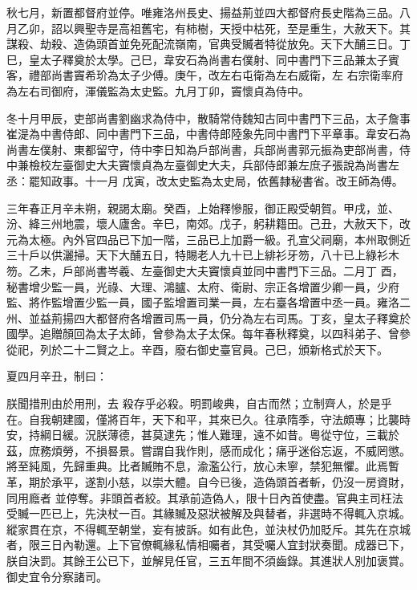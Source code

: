 \begin{pinyinscope}
 秋七月，新置都督府並停。唯雍洛州長史、揚益荊並四大都督府長史階為三品。八月乙卯，詔以興聖寺是高祖舊宅，有柿樹，天授中枯死，至是重生，大赦天下。其謀殺、劫殺、造偽頭首並免死配流嶺南，官典受贓者特從放免。天下大酺三日。丁巳，皇太子釋奠於太學。己巳，韋安石為尚書右僕射、同中書門下三品兼太子賓客，禮部尚書竇希玠為太子少傅。庚午，改左右屯衛為左右威衛，左
 右宗衛率府為左右司御府，渾儀監為太史監。九月丁卯，竇懷貞為侍中。



 冬十月甲辰，吏部尚書劉幽求為侍中，散騎常侍魏知古同中書門下三品，太子詹事崔湜為中書侍郎、同中書門下三品，中書侍郎陸象先同中書門下平章事。韋安石為尚書左僕射、東都留守，侍中李日知為戶部尚書，兵部尚書郭元振為吏部尚書，侍中兼檢校左臺御史大夫竇懷貞為左臺御史大夫，兵部侍郎兼左庶子張說為尚書左丞：罷知政事。十一月
 戊寅，改太史監為太史局，依舊隸秘書省。改王師為傅。



 三年春正月辛未朔，親謁太廟。癸酉，上始釋慘服，御正殿受朝賀。甲戌，並、汾、絳三州地震，壞人廬舍。辛巳，南郊。戊子，躬耕籍田。己丑，大赦天下，改元為太極。內外官四品已下加一階，三品已上加爵一級。孔宣父祠廟，本州取側近三十戶以供灑掃。天下大酺五日，特賜老人九十已上緋衫牙笏，八十已上綠衫木笏。乙未，戶部尚書岑羲、左臺御史大夫竇懷貞並同中書門下三品。二月丁
 酉，秘書增少監一員，光祿、大理、鴻臚、太府、衛尉、宗正各增置少卿一員，少府監、將作監增置少監一員，國子監增置司業一員，左右臺各增置中丞一員。雍洛二州、並益荊揚四大都督府各增置司馬一員，仍分為左右司馬。丁亥，皇太子釋奠於國學。追贈顏回為太子太師，曾參為太子太保。每年春秋釋奠，以四科弟子、曾參從祀，列於二十二賢之上。辛酉，廢右御史臺官員。己巳，頒新格式於天下。



 夏四月辛丑，制曰：



 朕聞措刑由於用刑，去
 殺存乎必殺。明罰峻典，自古而然；立制齊人，於是乎在。自我朝建國，僅將百年，天下和平，其來已久。往承隋季，守法頗專；比襲時安，持綱日緩。況朕薄德，甚莫逮先；惟人難理，遠不如昔。粵從守位，三載於茲，庶務煩勞，不損晷景。嘗謂自我作則，感而成化；痛乎迷俗忘返，不威罔懲。將至純風，先歸重典。比者贓賄不息，渝濫公行，放心未寧，禁犯無懼。此焉暫革，期於承平，遂割小慈，以崇大體。自今已後，造偽頭首者斬，仍沒一房資財，同用廕者
 並停奪。非頭首者絞。其承前造偽人，限十日內首使盡。官典主司枉法受贓一匹已上，先決杖一百。其緣贓及惡狀被解及與替者，非選時不得輒入京城。縱家貫在京，不得輒至朝堂，妄有披訴。如有此色，並決杖仍加貶斥。其先在京城者，限三日內勒還。上下官僚輒緣私情相囑者，其受囑人宜封狀奏聞。成器已下，朕自決罰。其餘王公已下，並解見任官，三五年間不須齒錄。其進狀人別加褒賞。御史宜令分察諸司。




\end{pinyinscope}
